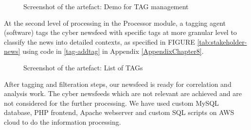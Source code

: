 \begin{figure}[ht]
    \centering
    \caption{Screenshot of the artefact: Demo for TAG management}
    \label{fig:tag}
\end{figure}
 \FloatBarrier
    At the second level of processing in the Processor module, a tagging agent (software) 
tags the  cyber newsfeed with specific tags at more granular level to classify 
the news into detailed contexts, 
as specified in FIGURE \ref{tab:stakeholder-news} using code in \ref{tag-addtag} in Appendix \ref{AppendixChapter8}.

\begin{figure}[ht]
    \centering
    \caption{Screenshot of the artefact: List of TAGs}
    \label{fig:Configured-tags}
\end{figure}
 \FloatBarrier

After tagging and filteration steps, 
our newsfeed is ready for correlation and analysis  work. The cyber newsfeeds which are not relevant are achieved and are not considered for the further processing.
We have used custom MySQL database, PHP frontend, Apache webserver and custom SQL scripts on AWS cloud to do the information processing.



